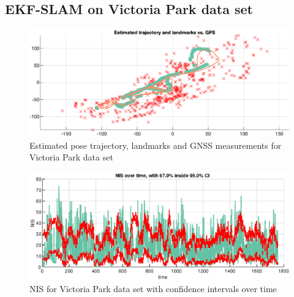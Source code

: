 \subsection{EKF-SLAM on Victoria Park data set}

\begin{figure}[!htb]
    \centering
    \includegraphics[width=0.8\linewidth]{figures/ga_3/real_trajectory.eps}
    \caption{Estimated pose trajectory, landmarks and GNSS measurements for Victoria Park data set}
    \label{fig:ga_3_real_trajectory}
\end{figure}

\begin{figure}[!htb]
    \centering
    \includegraphics[width=0.8\linewidth]{figures/ga_3/real_NIS.eps}
    \caption{NIS for Victoria Park data set with confidence intervals over time}
    \label{fig:ga_3_real_NIS}
\end{figure}